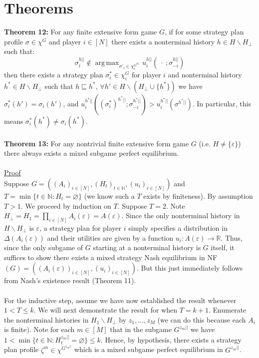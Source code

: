 \documentclass[11pt]{article}
\DeclareMathOperator*{\argmax}{arg\,max}
\theoremstyle{definition}
\theoremstyle{plain}
\begin{document}
\section{Theorems}
\textbf{Theorem 12:} For any finite extensive form game $G$, if for some strategy plan profile $\sigma \in \chi^G$ and player $i \in [N]$ there exists a nonterminal history $h \in H \backslash H_{\bot}$ such that:
$$\sigma^{h||}_i \notin \argmax_{\sigma'_i \in \chi^{G^{h||}}_i} u^{h||}_i(\ \cdot \ ; \sigma_{-i}^{h||})$$
then there exists a strategy plan $\sigma^*_i \in \chi^G_i$ for player $i$  and nonterminal history $h^* \in H \backslash H_{\bot}$ such that $h \sqsubseteq h^*$, $\forall h'\in H \backslash (H_{\bot} \cup \{h^*\})$ we  have $\sigma^*_i(h')=\sigma_i(h')$, and
$u_i^{h^*||}((\sigma^*_i)^{h^*||};  \sigma_{-i}^{h^*||})>u_i^{h^*||}(\sigma^{h^*||}).$ In particular, this means $\sigma^*_i(h^*) \neq \sigma_i(h^*)$. 
\\
\\
\noindent\textbf{Theorem 13:} For any nontrivial finite extensive form game $G$ (i.e. $H \neq \{\varepsilon\}$) there always exists a mixed subgame perfect equilibrium.
\\
\\
\underline{Proof}
\\
Suppose $G=((A_i)_{i \in [N]}, (H_t)_{t \in \mathbb{N}}, (u_i)_{i \in [N]})$ and $T=\min\{t \in \mathbb{N} : H_t=\varnothing\}$ (we know such a $T$ exists by finiteness). By assumption $T>1$. We proceed by induction on $T$. Suppose $T=2$. Note $H_\bot=H_1=\prod_{i \in [N]} A_i(\varepsilon)=A(\varepsilon)$.  Since the only nonterminal history in $H\backslash{H_{\bot}}$ is $\varepsilon$, a strategy plan for player $i$ simply specifies a distribution in $\Delta(A_i(\varepsilon))$ and their utilities are given by a function $u_i: A(\varepsilon) \to \mathbb{R}$. Thus, since the only subgame of $G$ starting at a nonterminal history is $G$ itself, it suffices to show there exists a mixed strategy Nash equilibrium in NF$(G)=((A_i(\varepsilon))_{i \in [N]}, (u_{i})_{i \in [N]})$. But this just immediately follows from Nash's existence result (Theorem 11). 
\\
\\
For the inductive step, assume we have now established the result whenever  $1<T \leq k$. We will next demonstrate the result for  when $T=k+1$. Enumerate the nonterminal histories in $H_1 \backslash H_{\bot}$ by $z_1,...,z_M$ (we can do this because each $A_i$ is finite). Note for each $m \in [M]$ that in the subgame $G^{z_m||}$ we have $1<\min\{t \in \mathbb{N} : H^{z_m||}_t=\varnothing\}\leq k$. Hence, by hypothesis, there exists a strategy plan profile $\zeta^m\in \chi^{G^{z_{m}||}}$ which is a mixed subgame perfect equilibrium in $G^{z_m||}$. 
\end{document}
